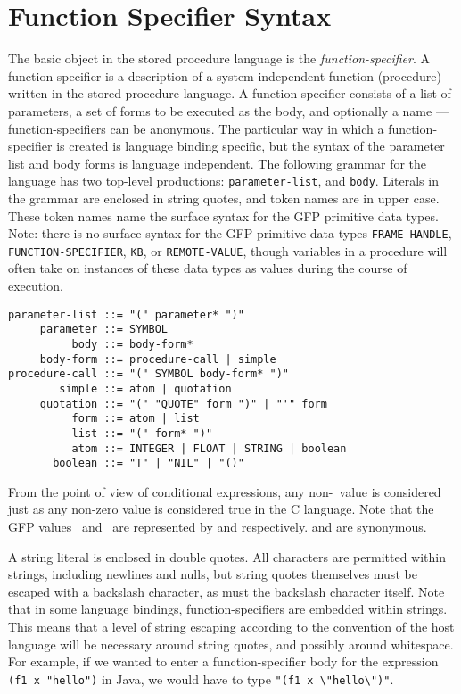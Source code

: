 \section{Function Specifier Syntax}

The basic object in the stored procedure language is the {\em
function-specifier}.  A function-specifier is a description of a
system-independent function (procedure) written in the stored
procedure language.  A function-specifier consists of a list of
parameters, a set of forms to be executed as the body, and optionally
a name --- function-specifiers can be anonymous.  The particular way
in which a function-specifier is created is language binding
specific, but the syntax of the parameter list and body forms is
language independent.  The following grammar for the language has two
top-level productions: {\tt parameter-list}, and {\tt body}.  Literals in the
grammar are enclosed in string quotes, and token names are in upper
case.  These token names name the surface syntax for the GFP primitive
data types.  Note: there is no surface syntax for the GFP primitive
data types {\tt FRAME-HANDLE}, {\tt FUNCTION-SPECIFIER}, {\tt KB}, or
{\tt REMOTE-VALUE}, though variables in a procedure will often take on
instances of these data types as values during the course of
execution.

\begin{verbatim}
parameter-list ::= "(" parameter* ")"
     parameter ::= SYMBOL
          body ::= body-form*
     body-form ::= procedure-call | simple
procedure-call ::= "(" SYMBOL body-form* ")"
        simple ::= atom | quotation
     quotation ::= "(" "QUOTE" form ")" | "'" form
          form ::= atom | list
          list ::= "(" form* ")"
          atom ::= INTEGER | FLOAT | STRING | boolean
       boolean ::= "T" | "NIL" | "()"
\end{verbatim}

From the point of view of conditional expressions, any
non-\falsefalse\ value is considered \true\, just as any non-zero
value is considered true in the C language.  Note that the GFP values
\true\ and \false\ are represented by  and 
respectively.   and \code{()} are synonymous.

A string literal is enclosed in double quotes.  All characters are
permitted within strings, including newlines and nulls, but string
quotes themselves must be escaped with a backslash character, as must
the backslash character itself.  Note that in some language bindings,
function-specifiers are embedded within strings.  This means that a
level of string escaping according to the convention of the host
language will be necessary around string quotes, and possibly around
whitespace.  For example, if we wanted to enter a function-specifier
body for the expression {\tt (f1 x "hello")} in Java, we would have to
type {\tt "(f1 x \verb!\"!hello\verb!\"!)"}.


